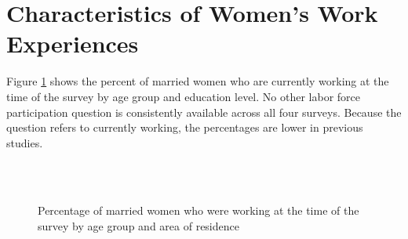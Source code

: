\documentclass[12pt,letterpaper]{article}
\begin{document}
\clearpage
\newpage

\section{Characteristics of Women's Work Experiences}

\setcounter{figure}{0}
\setcounter{table}{0}

Figure \ref{fig:work_by_survey} shows the percent of married women who are 
currently working at the time of the survey by age group and education level.
No other labor force participation question is consistently available across all 
four surveys. 
Because the question refers to currently working, the percentages are lower in previous
studies. 


\begin{figure}[!htpb]
\centering
{}
\\
\\
\caption{Percentage of married women who were working at the time of the 
survey by age group and area of residence}
\label{fig:work_by_survey}
\end{figure}
\end{document}
